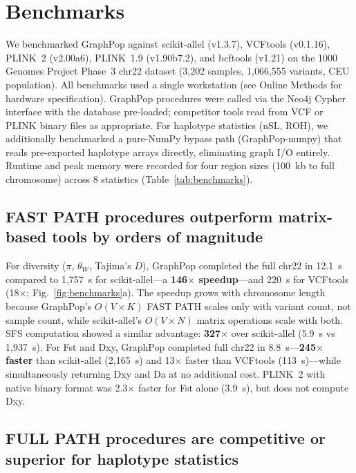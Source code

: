 \section*{Benchmarks}

We benchmarked GraphPop against scikit-allel (v1.3.7), VCFtools (v0.1.16), PLINK~2 (v2.00a6), PLINK~1.9 (v1.90b7.2), and bcftools (v1.21) on the 1000 Genomes Project Phase~3 chr22 dataset (3{,}202 samples, 1{,}066{,}555 variants, CEU population). All benchmarks used a single workstation (see Online Methods for hardware specification). GraphPop procedures were called via the Neo4j Cypher interface with the database pre-loaded; competitor tools read from VCF or PLINK binary files as appropriate. For haplotype statistics (nSL, ROH), we additionally benchmarked a pure-NumPy bypass path (GraphPop-numpy) that reads pre-exported haplotype arrays directly, eliminating graph I/O entirely. Runtime and peak memory were recorded for four region sizes (100~kb to full chromosome) across 8 statistics (Table~\ref{tab:benchmarks}).

\subsection*{FAST PATH procedures outperform matrix-based tools by orders of magnitude}

For diversity ($\pi$, $\theta_W$, Tajima's $D$), GraphPop completed the full chr22 in 12.1~s compared to 1{,}757~s for scikit-allel---a \textbf{146$\times$ speedup}---and 220~s for VCFtools (18$\times$; Fig.~\ref{fig:benchmarks}a). The speedup grows with chromosome length because GraphPop's $O(V \times K)$ FAST PATH scales only with variant count, not sample count, while scikit-allel's $O(V \times N)$ matrix operations scale with both. SFS computation showed a similar advantage: \textbf{327$\times$} over scikit-allel (5.9~s vs 1{,}937~s). For Fst and Dxy, GraphPop completed full chr22 in 8.8~s---\textbf{245$\times$ faster} than scikit-allel (2{,}165~s) and 13$\times$ faster than VCFtools (113~s)---while simultaneously returning Dxy and Da at no additional cost. PLINK~2 with native binary format was 2.3$\times$ faster for Fst alone (3.9~s), but does not compute Dxy.

\subsection*{FULL PATH procedures are competitive or superior for haplotype statistics}

